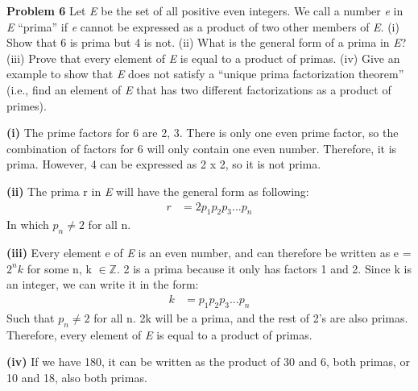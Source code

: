 \documentclass[12pt,letterpaper]{hmcpset}
\begin{document}
\begin{problem}
\textbf{Problem 6} Let \emph{E} be the set of all positive even integers. We call a number \emph{e} in \emph{E} “prima” if \emph{e} cannot be expressed as a product of two other members of \emph{E}.
\newline(i) Show that 6 is prima but 4 is not.
\newline(ii) What is the general form of a prima in \emph{E}?
\newline(iii) Prove that every element of \emph{E} is equal to a product of primas.
\newline(iv) Give an example to show that \emph{E} does not satisfy a “unique prima factorization theorem” (i.e., find an element of \emph{E} that has two different factorizations as a product of primes).
\end{problem}
\begin{solution}
\textbf{(i)} The prime factors for 6 are 2, 3. There is only one even prime factor, so the combination of factors for 6 will only contain one even number. Therefore, it is prima. However, 4 can be expressed as 2 x 2, so it is not prima.
\end{solution}

\begin{solution}
\textbf{(ii)} The prima r in \emph{E} will have the general form as following:
\begin{align*}
r	&= 2p_1p_2p_3...p_n
\end{align*}
In which $p_n \neq 2$ for all n.
\end{solution}

\begin{solution}
\textbf{(iii)} Every element e of \emph{E} is an even number, and can therefore be written as e = $2^{n}k$ for some n, k $\in\mathbb{Z}$. 2 is a prima because it only has factors 1 and 2. Since k is an integer, we can write it in the form:
\begin{align*}
k	&= p_1p_2p_3...p_n
\end{align*}
Such that $p_n \neq 2$ for all n. 2k will be a prima, and the rest of 2's are also primas. Therefore, every element of \emph{E} is equal to a product of primas.
\end{solution}

\begin{solution}
\textbf{(iv)} If we have 180, it can be written as the product of 30 and 6, both primas, or 10 and 18, also both primas.
\end{solution}
\end{document}
